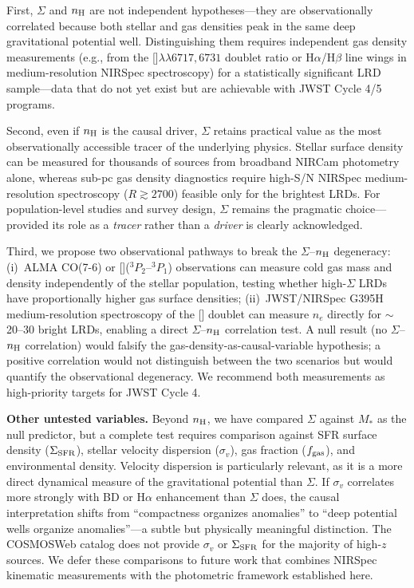 \documentclass[twocolumn,linenumbers]{aastex631}
\begin{document}
First, $\Sigma$ and $n_{\rm H}$ are not independent hypotheses---they are observationally correlated because both stellar and gas densities peak in the same deep gravitational potential well. Distinguishing them requires independent gas density measurements (e.g., from the []$\lambda\lambda6717,6731$ doublet ratio or H$\alpha$/H$\beta$ line wings in medium-resolution NIRSpec spectroscopy) for a statistically significant LRD sample---data that do not yet exist but are achievable with JWST Cycle 4/5 programs.

Second, even if $n_{\rm H}$ is the causal driver, $\Sigma$ retains practical value as the most observationally accessible tracer of the underlying physics. Stellar surface density can be measured for thousands of sources from broadband NIRCam photometry alone, whereas sub-pc gas density diagnostics require high-S/N NIRSpec medium-resolution spectroscopy ($R \gtrsim 2700$) feasible only for the brightest LRDs. For population-level studies and survey design, $\Sigma$ remains the pragmatic choice---provided its role as a \textit{tracer} rather than a \textit{driver} is clearly acknowledged.

Third, we propose two observational pathways to break the $\Sigma$--$n_{\rm H}$ degeneracy: (i)~ALMA CO(7-6) or []($^3P_2$--$^3P_1$) observations can measure cold gas mass and density independently of the stellar population, testing whether high-$\Sigma$ LRDs have proportionally higher gas surface densities; (ii)~JWST/NIRSpec G395H medium-resolution spectroscopy of the [] doublet can measure $n_e$ directly for $\sim$20--30 bright LRDs, enabling a direct $\Sigma$--$n_{\rm H}$ correlation test. A null result (no $\Sigma$--$n_{\rm H}$ correlation) would falsify the gas-density-as-causal-variable hypothesis; a positive correlation would not distinguish between the two scenarios but would quantify the observational degeneracy. We recommend both measurements as high-priority targets for JWST Cycle 4.

\textbf{Other untested variables.} Beyond $n_{\rm H}$, we have compared $\Sigma$ against $M_*$ as the null predictor, but a complete test requires comparison against SFR surface density ($\Sigma_{\rm SFR}$), stellar velocity dispersion ($\sigma_v$), gas fraction ($f_{\rm gas}$), and environmental density. Velocity dispersion is particularly relevant, as it is a more direct dynamical measure of the gravitational potential than $\Sigma$. If $\sigma_v$ correlates more strongly with BD or H$\alpha$ enhancement than $\Sigma$ does, the causal interpretation shifts from ``compactness organizes anomalies'' to ``deep potential wells organize anomalies''---a subtle but physically meaningful distinction. The COSMOSWeb catalog does not provide $\sigma_v$ or $\Sigma_{\rm SFR}$ for the majority of high-$z$ sources. We defer these comparisons to future work that combines NIRSpec kinematic measurements with the photometric framework established here.
\end{document}
